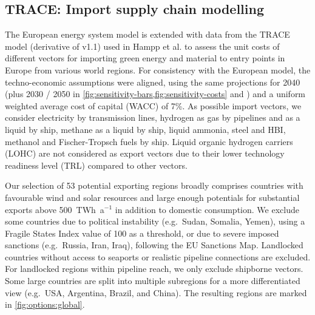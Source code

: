\subsection*{TRACE: Import supply chain modelling}
\label{sec:methods-trace}

The European energy system model is extended with data from the TRACE model
(derivative of v1.1) used in Hampp et al.\cite{hamppImportOptions2023} to assess
the unit costs of different vectors for importing green energy and material to
entry points in Europe from various world regions. For consistency with the
European model, the techno-economic assumptions were aligned, using the same
projections for 2040 (plus 2030 / 2050 in
\cref{fig:sensitivity-bars,fig:sensitivity-costs} and )
and a uniform weighted average cost of capital (WACC) of
7\%.\cite{lonerganImprovingRepresentationCost2023} As possible import vectors,
we consider electricity by transmission lines, hydrogen as gas by pipelines and
as a liquid by ship, methane as a liquid by ship, liquid ammonia, steel and HBI,
methanol and Fischer-Tropsch fuels by ship. Liquid organic hydrogen carriers
(LOHC) are not considered as export vectors due to their lower technology
readiness level (TRL) compared to other
vectors.\cite{irenaGlobalHydrogenTrade2022}

Our selection of 53 potential exporting regions broadly comprises countries with
favourable wind and solar resources and large enough potentials for substantial
exports above 500~TWh~a$^{-1}$ in addition to domestic consumption. We exclude
some countries due to political instability (e.g.~Sudan, Somalia, Yemen), using
a Fragile States Index\cite{thefundforpeaceffpFragileStatesIndex2023} value of
100 as a threshold, or due to severe imposed sanctions (e.g.~Russia, Iran,
Iraq), following the EU Sanctions
Map.\cite{estonianpresidencyofthecounciloftheeuEUSanctionsMap2024} Landlocked
countries without access to seaports or realistic pipeline connections are
excluded. For landlocked regions within pipeline reach, we only exclude
shipborne vectors. Some large countries are split into multiple subregions for
a more differentiated view (e.g.~USA, Argentina, Brazil, and China). The
resulting regions are marked in \cref{fig:options:global}.



